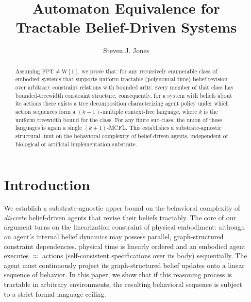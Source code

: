 \documentclass[runningheads]{llncs}
\begin{document}
%
\title{Automaton Equivalence for Tractable Belief-Driven Systems}
%
%
\author{Steven J. Jones}
%
%
%
\maketitle
%
\begin{abstract}
Assuming $\mathrm{FPT} \neq \mathrm{W}[1]$, we prove that: for any recursively enumerable class of embodied systems that supports uniform tractable (polynomial-time) belief revision over arbitrary constraint relations with bounded arity, every member of that class has bounded-treewidth constraint structure; consequently, for a system with beliefs about its actions there exists a tree decomposition characterizing agent policy under which action sequences form a $(k{+}1)$-multiple context-free language, where $k$ is the uniform treewidth bound for the class.
For any finite sub-class, the union of these languages is again a single $(k{+}1)$-MCFL.
This establishes a substrate-agnostic structural limit on the behavioral complexity of belief-driven agents, independent of biological or artificial implementation substrate.

\end{abstract}

\section{Introduction}\label{sec:intro}

We establish a substrate-agnostic upper bound on the behavioral complexity of \emph{discrete} belief-driven agents that revise their beliefs tractably.
The core of our argument turns on the linearization constraint of physical embodiment: although an agent's internal belief dynamics may possess parallel, graph-structured constraint dependencies, physical time is linearly ordered and an embodied agent executes $\approx$ actions (self-consistent specifications over its body) sequentially. The agent must continuously project its graph-structured belief updates onto a linear sequence of behavior. In this paper, we show that if this reasoning process is tractable in arbitrary environments, the resulting behavioral sequence is subject to a strict formal-language ceiling.
\end{document}
